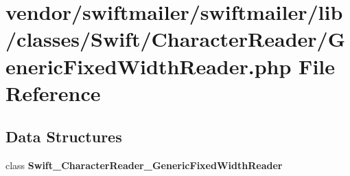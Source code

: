 \section{vendor/swiftmailer/swiftmailer/lib/classes/\+Swift/\+Character\+Reader/\+Generic\+Fixed\+Width\+Reader.php File Reference}
\label{_generic_fixed_width_reader_8php}
\subsection*{Data Structures}
\begin{DoxyCompactItemize}
\item 
class {\bf Swift\+\_\+\+Character\+Reader\+\_\+\+Generic\+Fixed\+Width\+Reader}
\end{DoxyCompactItemize}
